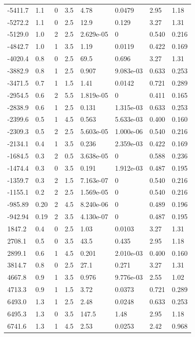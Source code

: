 \documentclass[preview]{standalone}
\begin{document}
{{\begin{tabular}{L{1.2cm}C{1.2cm} C{0.3cm}C{0.5cm} C{1.4cm}C{1.4cm} C{1.4cm}C{1.4cm}}
  -5411.7  &   1.1  & 0     & 3.5 &  4.78  & 0.0479  & 2.95 &  1.18   \\ 
  -5272.2  &   1.1  & 0     & 2.5 &  12.9  & 0.129  & 3.27 &  1.31   \\ 
  -5129.0  &   1.0  & 2     & 2.5 &  2.629e-05  & 0  & 0.540 &  0.216   \\ 
  -4842.7  &   1.0  & 1     & 3.5 &  1.19  & 0.0119  & 0.422 &  0.169   \\ 
  -4020.4  &   0.8  & 0     & 2.5 &  69.5  & 0.696  & 3.27 &  1.31   \\ 
  -3882.9  &   0.8  & 1     & 2.5 &  0.907  & 9.083e-03  & 0.633 &  0.253   \\ 
  -3471.5  &   0.7  & 1     & 1.5 &  1.41  & 0.0142  & 0.721 &  0.289   \\ 
  -2954.5  &   0.6  & 2     & 5.5 &  1.819e-05  & 0  & 0.411 &  0.165   \\ 
  -2838.9  &   0.6  & 1     & 2.5 &  0.131  & 1.315e-03  & 0.633 &  0.253   \\ 
  -2399.6  &   0.5  & 1     & 4.5 &  0.563  & 5.633e-03  & 0.400 &  0.160   \\ 
  -2309.3  &   0.5  & 2     & 2.5 &  5.603e-05  & 1.000e-06  & 0.540 &  0.216   \\ 
  -2134.1  &   0.4  & 1     & 3.5 &  0.236  & 2.359e-03  & 0.422 &  0.169   \\ 
  -1684.5  &   0.3  & 2     & 0.5 &  3.638e-05  & 0  & 0.588 &  0.236   \\ 
  -1474.4  &   0.3  & 0     & 3.5 &  0.191  & 1.912e-03  & 0.487 &  0.195   \\ 
  -1359.7  &   0.3  & 2     & 1.5 &  7.163e-07  & 0  & 0.540 &  0.216   \\ 
  -1155.1  &   0.2  & 2     & 2.5 &  1.569e-05  & 0  & 0.540 &  0.216   \\ 
  -985.89  &  0.20  & 2     & 4.5 &  8.240e-06  & 0  & 0.489 &  0.196   \\ 
  -942.94  &  0.19  & 2     & 3.5 &  4.130e-07  & 0  & 0.487 &  0.195   \\ 
  1847.2  &   0.4  & 0     & 2.5 &  1.03  & 0.0103  & 3.27 &  1.31   \\ 
  2708.1  &   0.5  & 0     & 3.5 &  43.5  & 0.435  & 2.95 &  1.18   \\ 
  2899.1  &   0.6  & 1     & 4.5 &  0.201  & 2.010e-03  & 0.400 &  0.160   \\ 
  3814.7  &   0.8  & 0     & 2.5 &  27.1  & 0.271  & 3.27 &  1.31   \\ 
  4667.8  &   0.9  & 1     & 3.5 &  0.976  & 9.776e-03  & 2.55 &  1.02   \\ 
  4713.3  &   0.9  & 1     & 1.5 &  3.72  & 0.0373  & 0.721 &  0.289   \\ 
  6493.0  &   1.3  & 1     & 2.5 &  2.48  & 0.0248  & 0.633 &  0.253   \\ 
  6495.3  &   1.3  & 0     & 3.5 &  147.5  & 1.48  & 2.95 &  1.18   \\ 
  6741.6  &   1.3  & 1     & 4.5 &  2.53  & 0.0253  & 2.42 &  0.968   \\ 
\hline 
\end{tabular} 

}}
\end{document}
